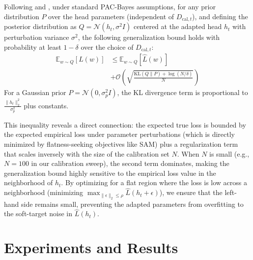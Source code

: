 \documentclass{article}
\theoremstyle{plain}
\theoremstyle{definition}
\theoremstyle{remark}
\begin{document}
Following \cite{foret2020sharpness} and \cite{mcallester1999pac}, under standard PAC-Bayes assumptions, for any prior distribution $P$ over the head parameters (independent of $D_{\text{cal}, t}$), and defining the posterior distribution as $Q = \mathcal{N}(h_t, \sigma^2 I)$ centered at the adapted head $h_t$ with perturbation variance $\sigma^2$, the following generalization bound holds with probability at least $1-\delta$ over the choice of $D_{\text{cal}, t}$:
\begin{align}
    \mathbb{E}_{w \sim Q} [L(w)] &\le \mathbb{E}_{w \sim Q} [\hat{L}(w)] \nonumber \\
    &+ \mathcal{O}\left( \sqrt{\frac{\text{KL}(Q \parallel P) + \log(N/\delta)}{N}} \right)
\end{align}
For a Gaussian prior $P = \mathcal{N}(0, \sigma_p^2 I)$, the KL divergence term is proportional to $\frac{\|h_t\|_2^2}{\sigma_p^2}$ plus constants. 

This inequality reveals a direct connection: the expected true loss is bounded by the expected empirical loss under parameter perturbations (which is directly minimized by flatness-seeking objectives like SAM) plus a regularization term that scales inversely with the size of the calibration set $N$. When $N$ is small (e.g., $N = 100$ in our calibration sweep), the second term dominates, making the generalization bound highly sensitive to the empirical loss value in the neighborhood of $h_t$. By optimizing for a flat region where the loss is low across a neighborhood (minimizing $\max_{\|\epsilon\|_2 \le \rho} \hat{L}(h_t + \epsilon)$), we ensure that the left-hand side remains small, preventing the adapted parameters from overfitting to the soft-target noise in $\hat{L}(h_t)$.

\section{Experiments and Results}
\label{submission-sec:experiments}
\end{document}

